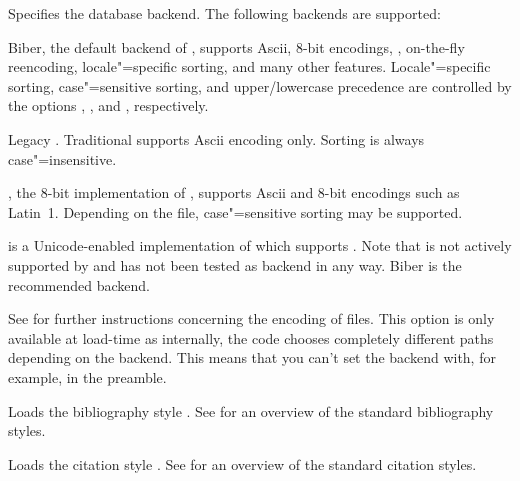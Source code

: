 \documentclass{ltxdockit}[2011/03/25]
\newcommand*{\biber}{Biber\xspace}
\begin{document}
\begin{optionlist}


Specifies the database backend. The following backends are supported:

\begin{valuelist}

\item[biber] \biber, the default backend of , supports Ascii, 8-bit encodings, \utf, on-the-fly reencoding, locale"=specific sorting, and many other features. Locale"=specific sorting, case"=sensitive sorting, and upper\slash lowercase precedence are controlled by the options , , and , respectively.

\item[bibtex] Legacy \bibtex. Traditional \bibtex supports Ascii encoding only. Sorting is always case"=insensitive.

\item[bibtex8] , the 8-bit implementation of \bibtex, supports Ascii and 8-bit encodings such as Latin~1. Depending on the  file, case"=sensitive sorting may be supported.

\item[bibtexu]  is a Unicode-enabled implementation of \bibtex which supports \utf. Note that  is not actively supported by  and has not been tested as backend in any way. \biber is the recommended backend.

\end{valuelist}

See  for further instructions concerning the encoding of  files. This option is only available at load-time as internally, the code chooses completely different paths depending on the backend. This means that you can't set the backend with, for example,  in the preamble.


Loads the bibliography style . See  for an overview of the standard bibliography styles.


Loads the citation style . See  for an overview of the standard citation styles.


\end{optionlist}
\end{document}
